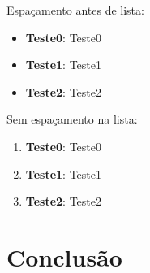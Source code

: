 \documentclass[a4paper,11pt]{article}
\begin{document}
Espaçamento antes de lista: \vspace{-1em}
\begin{itemize}
	\item \textbf{Teste0}: Teste0
    \item \textbf{Teste1}: Teste1
    \item \textbf{Teste2}: Teste2
\end{itemize}

Sem espaçamento na lista:

\begin{enumerate}[nolistsep]
	\item \textbf{Teste0}: Teste0
	\item \textbf{Teste1}: Teste1
	\item \textbf{Teste2}: Teste2
\end{enumerate}


\section{Conclusão}



\begin{thebibliography}{3}
	
\end{thebibliography}
\end{document}
